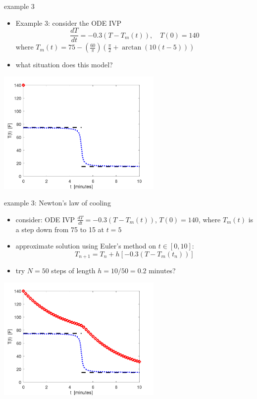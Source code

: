 \documentclass[colorlinks]{beamer}
\newcommand{\ds}{\displaystyle}
\begin{document}
\begin{frame}{example 3}

\begin{itemize}
\item Example 3:  consider the ODE IVP
    $$\frac{dT}{dt} = - 0.3 \left(T - T_m(t)\right), \quad T(0)=140$$
where \quad $\ds T_m(t) = 75 - \left(\frac{60}{\pi}\right) \left(\frac{\pi}{2} + \arctan(10 (t - 5))\right)$
\item what situation does this model?
\end{itemize}

\centering
\includegraphics[width=0.6\textwidth]{figs/beforewalk.png}
\end{frame}


\begin{frame}{example 3: Newton's law of cooling}

\begin{itemize}
\small
\item consider: ODE IVP $\ds\frac{dT}{dt} = - 0.3 \left(T - T_m(t)\right)$, $T(0)=140$, where $\ds T_m(t)$ is a step down from 75 to 15 at $t=5$

\normalsize
    
\item approximate solution using Euler's method on $t\in[0,10]$:
	$$T_{n+1} = T_n + h \left[- 0.3 \left(T - T_m(t_n)\right)\right]$$
\item try $N=50$ steps of length $\ds h=10/50 = 0.2$ minutes?
\end{itemize}

\centering
\includegraphics[width=0.6\textwidth]{figs/walkoutside.png}
\end{frame}
\end{document}
